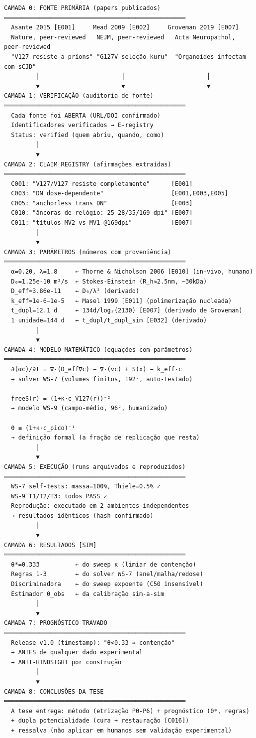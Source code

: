 \documentclass[
  12pt,
]{report}
\begin{document}
\begin{verbatim}
CAMADA 0: FONTE PRIMÁRIA (papers publicados)
═══════════════════════════════════════════════════
  Asante 2015 [E001]     Mead 2009 [E002]     Groveman 2019 [E007]
  Nature, peer-reviewed   NEJM, peer-reviewed   Acta Neuropathol, peer-reviewed
  "V127 resiste a príons" "G127V seleção kuru"  "Organoides infectam com sCJD"
         │                       │                       │
         ▼                       ▼                       ▼
CAMADA 1: VERIFICAÇÃO (auditoria de fonte)
═══════════════════════════════════════════════════
  Cada fonte foi ABERTA (URL/DOI confirmado)
  Identificadores verificados → E-registry
  Status: verified (quem abriu, quando, como)
         │
         ▼
CAMADA 2: CLAIM REGISTRY (afirmações extraídas)
═══════════════════════════════════════════════════
  C001: "V127/V127 resiste completamente"      [E001]
  C003: "DN dose-dependente"                   [E001,E003,E005]
  C005: "anchorless trans DN"                  [E003]
  C010: "âncoras de relógio: 25-28/35/169 dpi" [E007]
  C011: "títulos MV2 vs MV1 @169dpi"           [E007]
         │
         ▼
CAMADA 3: PARÂMETROS (números com proveniência)
═══════════════════════════════════════════════════
  α=0.20, λ=1.8     ← Thorne & Nicholson 2006 [E010] (in-vivo, humano)
  D₀=1.25e-10 m²/s  ← Stokes-Einstein (R_h≈2.5nm, ~30kDa)
  D_eff=3.86e-11    ← D₀/λ² (derivado)
  k_eff=1e-6–1e-5   ← Masel 1999 [E011] (polimerização nucleada)
  t_dupl=12.1 d     ← 134d/log₂(2130) [E007] (derivado de Groveman)
  1 unidade=144 d   ← t_dupl/t_dupl_sim [E032] (derivado)
         │
         ▼
CAMADA 4: MODELO MATEMÁTICO (equações com parâmetros)
═══════════════════════════════════════════════════
  ∂(αc)/∂t = ∇·(D_eff∇c) − ∇·(vc) + S(x) − k_eff·c
  → solver WS-7 (volumes finitos, 192², auto-testado)

  freeS(r) = (1+κ·c_V127(r))⁻²
  → modelo WS-9 (campo-médio, 96², humanizado)

  θ ≡ (1+κ·c_pico)⁻¹
  → definição formal (a fração de replicação que resta)
         │
         ▼
CAMADA 5: EXECUÇÃO (runs arquivados e reproduzidos)
═══════════════════════════════════════════════════
  WS-7 self-tests: massa=100%, Thiele=0.5% ✓
  WS-9 T1/T2/T3: todos PASS ✓
  Reprodução: executado em 2 ambientes independentes
  → resultados idênticos (hash confirmado)
         │
         ▼
CAMADA 6: RESULTADOS [SIM]
═══════════════════════════════════════════════════
  θ*=0.333          ← do sweep κ (limiar de contenção)
  Regras 1-3        ← do solver WS-7 (anel/malha/redose)
  Discriminadora    ← do sweep expoente (C50 insensível)
  Estimador θ_obs   ← da calibração sim-a-sim
         │
         ▼
CAMADA 7: PROGNÓSTICO TRAVADO
═══════════════════════════════════════════════════
  Release v1.0 (timestamp): "θ<0.33 ⇒ contenção"
  → ANTES de qualquer dado experimental
  → ANTI-HINDSIGHT por construção
         │
         ▼
CAMADA 8: CONCLUSÕES DA TESE
═══════════════════════════════════════════════════
  A tese entrega: método (etrização P0-P6) + prognóstico (θ*, regras)
  + dupla potencialidade (cura + restauração [C016])
  + ressalva (não aplicar em humanos sem validação experimental)
\end{verbatim}
\end{document}
